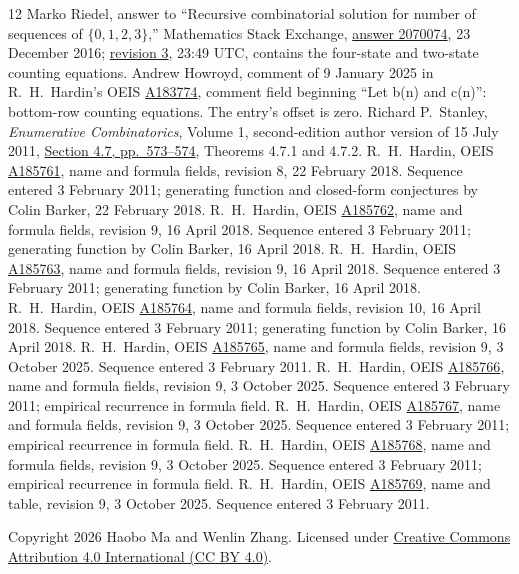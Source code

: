 \documentclass[11pt]{article}
\begin{document}
\begingroup\small
\begin{thebibliography}{12}
 Marko Riedel, answer to ``Recursive combinatorial solution
for number of sequences of $\{0,1,2,3\}$,'' Mathematics Stack Exchange,
\href{https://math.stackexchange.com/a/2070074}{answer 2070074},
23 December 2016; \href{https://math.stackexchange.com/revisions/2070074/3}{revision 3},
23:49 UTC, contains the four-state and two-state counting equations.
 Andrew Howroyd, comment of 9 January 2025 in R.\ H.\
Hardin's OEIS \href{https://oeis.org/A183774/internal}{A183774},
comment field beginning ``Let b(n) and c(n)'': bottom-row counting
equations. The entry's offset is zero.
 Richard P.\ Stanley, \emph{Enumerative Combinatorics},
Volume 1, second-edition author version of 15 July 2011,
\href{https://math.mit.edu/~rstan/ec/ec1.pdf}{Section 4.7, pp.\ 573--574},
Theorems 4.7.1 and 4.7.2.
 R.\ H.\ Hardin, OEIS \href{https://oeis.org/A185761}{A185761},
name and formula fields, revision 8, 22 February 2018.
Sequence entered 3 February 2011; generating function and closed-form
conjectures by Colin Barker, 22 February 2018.
 R.\ H.\ Hardin, OEIS \href{https://oeis.org/A185762}{A185762},
name and formula fields, revision 9, 16 April 2018.
Sequence entered 3 February 2011; generating function by Colin Barker,
16 April 2018.
 R.\ H.\ Hardin, OEIS \href{https://oeis.org/A185763}{A185763},
name and formula fields, revision 9, 16 April 2018.
Sequence entered 3 February 2011; generating function by Colin Barker,
16 April 2018.
 R.\ H.\ Hardin, OEIS \href{https://oeis.org/A185764}{A185764},
name and formula fields, revision 10, 16 April 2018.
Sequence entered 3 February 2011; generating function by Colin Barker,
16 April 2018.
 R.\ H.\ Hardin, OEIS \href{https://oeis.org/A185765}{A185765},
name and formula fields, revision 9, 3 October 2025.
Sequence entered 3 February 2011.
 R.\ H.\ Hardin, OEIS \href{https://oeis.org/A185766}{A185766},
name and formula fields, revision 9, 3 October 2025.
Sequence entered 3 February 2011; empirical recurrence in formula field.
\bibitem{oeis8} R.\ H.\ Hardin, OEIS \href{https://oeis.org/A185767}{A185767},
name and formula fields, revision 9, 3 October 2025.
Sequence entered 3 February 2011; empirical recurrence in formula field.
\bibitem{oeis9} R.\ H.\ Hardin, OEIS \href{https://oeis.org/A185768}{A185768},
name and formula fields, revision 9, 3 October 2025.
Sequence entered 3 February 2011; empirical recurrence in formula field.
\bibitem{oeistable} R.\ H.\ Hardin, OEIS
\href{https://oeis.org/A185769}{A185769}, name and table, revision 9,
3 October 2025. Sequence entered 3 February 2011.
\end{thebibliography}
\noindent\small Copyright 2026 Haobo Ma and Wenlin Zhang.
Licensed under \href{https://creativecommons.org/licenses/by/4.0/}{Creative
Commons Attribution 4.0 International (CC BY 4.0)}.
\endgroup
\end{document}

